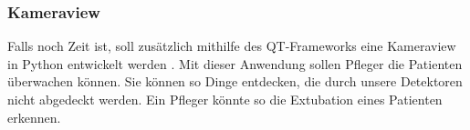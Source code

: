 \subsubsection{Kameraview}
Falls noch Zeit ist, soll zusätzlich mithilfe des QT-Frameworks eine Kameraview  in Python entwickelt werden \cite{Python} \cite{QT} . Mit dieser Anwendung sollen  Pfleger die Patienten überwachen können. Sie können so Dinge entdecken, die durch unsere Detektoren nicht abgedeckt werden. Ein Pfleger könnte so die Extubation eines Patienten erkennen. 
